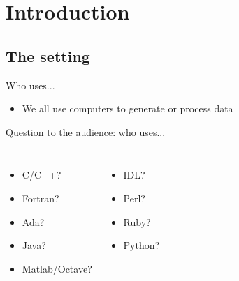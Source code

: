 \section{Introduction}

\subsection{The setting}

\begin{frame}{Who uses...}

\begin{itemize}
	\item We all use computers to generate or process data
\end{itemize}

Question to the audience: who uses...

\begin{columns}[t]


\begin{itemize}
	\item C/C++?
	\item Fortran?
	\item Ada?
	\item Java?
	\item Matlab/Octave?
\end{itemize}


\begin{itemize}
	\item IDL?
	\item Perl?
	\item Ruby?
	\item \alert{Python}?
\end{itemize}

\end{columns}

\end{frame}

